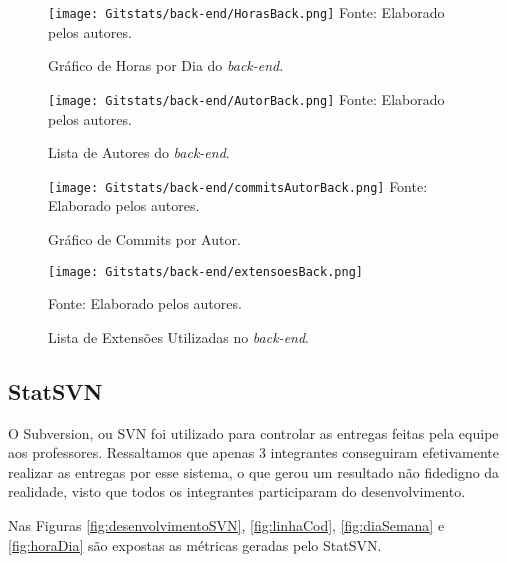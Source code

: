 \documentclass[
    12pt,               %
    openright,          %
    oneside,
    a4paper,            %
    BIBLATEX,           %
    TODO,               %
    english,            %
    brazil              %
    ]{ifsp-spo-inf-ctds}
\begin{document}
            \begin{figure}[H]
                \centering
                \caption{Gráfico de Horas por Dia do \emph{back-end}.}
                \texttt{[image: Gitstats/back-end/HorasBack.png]}
                {\footnotesize Fonte: Elaborado pelos autores.}
                \label{fig:HorasBack}
            \end{figure} 

            \begin{figure}[H]
                \centering
                \caption{Lista de Autores do \emph{back-end}.}
                \texttt{[image: Gitstats/back-end/AutorBack.png]}
                {\footnotesize Fonte: Elaborado pelos autores.}
                \label{fig:AutorBack}
            \end{figure}

            \begin{figure}[H]
                \centering
                \caption{Gráfico de Commits por Autor.}
                \texttt{[image: Gitstats/back-end/commitsAutorBack.png]}
                {\footnotesize Fonte: Elaborado pelos autores.}
                \label{fig:commitBack}
            \end{figure}    

            \begin{figure}[H]
                \centering
                \caption{Lista de Extensões Utilizadas no \emph{back-end}.}
                \texttt{[image: Gitstats/back-end/extensoesBack.png]}

                {\footnotesize Fonte: Elaborado pelos autores.}
                \label{fig:extensoesBack}
            \end{figure}  


    \subsection{StatSVN}

        O Subversion, ou SVN foi utilizado para controlar as entregas feitas pela equipe aos professores. Ressaltamos que apenas 3 integrantes conseguiram efetivamente realizar as entregas por esse sistema, o que gerou um resultado não fidedigno da realidade, visto que todos os integrantes participaram do desenvolvimento. 

        Nas Figuras \ref{fig:desenvolvimentoSVN}, \ref{fig:linhaCod}, \ref{fig:diaSemana} e \ref{fig:horaDia} são expostas as métricas geradas pelo StatSVN.
\end{document}
